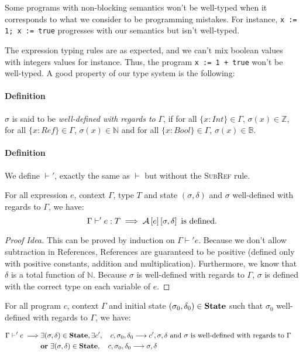 Some programs with non-blocking semantics won't be well-typed when it corresponds to what we consider to be programming mistakes. For instance, \texttt{x := 1; x := true} progresses with our semantics but isn't well-typed.

The expression typing rules are as expected, and we can't mix boolean values with integers values for instance. Thus, the program \texttt{x := 1 + true} won't be well-typed. A good property of our type system is the following:\\

\paragraph{Definition} $\sigma$ is said to be \textit{well-defined with regards to} $\Gamma$, if for all $\{x:Int\}\in\Gamma$, $\sigma(x)\in\mathbb{Z}$, for all $\{x:Ref\}\in\Gamma$, $\sigma(x)\in\mathbb{N}$ and for all $\{x:Bool\}\in\Gamma$, $\sigma(x)\in\mathbb{B}$.

\paragraph{Definition} We define $\vdash'$, exactly the same as $\vdash$ but without the \textsc{SubRef} rule.

\begin{thm}
For all expression $e$, context $\Gamma$, type $T$ and state $(\sigma, \delta)$ and $\sigma$ well-defined with regards to $\Gamma$, we have:
\[
\Gamma\vdash' e : T\implies \mathcal{A}\left[e\right]\left[\sigma,\delta\right]\text{ is defined}.
\]
\end{thm}

\begin{proof}[Proof Idea]
This can be proved by induction on $\Gamma\vdash' e$. Because we don't allow subtraction in References, References are guaranteed to be positive (defined only with positive constants, addition and multiplication). Furthermore, we know that $\delta$ is a total function of $\mathbb{N}$. Because $\sigma$ is well-defined with regards to $\Gamma$, $\sigma$ is defined with the correct type on each variable of $e$.
\end{proof}


\begin{thm}[Progress]
For all program $c$, context $\Gamma$ and initial state $(\sigma_0, \delta_0) \in \mathbf{State}{}$ such that $\sigma_0$ well-defined with regards to $\Gamma$, we have:

\begin{align*}
  \Gamma \vdash' c \implies & \exists (\sigma, \delta) \in \mathbf{State}{}, \exists c', \quad c, \sigma_0, \delta_0 \longrightarrow c',\sigma, \delta \text{ and $\sigma$ is well-defined with regards to $\Gamma$\quad} \\
  & \textbf{or}~ \exists (\sigma, \delta) \in \mathbf{State}{}, \quad c, \sigma_0, \delta_0 \longrightarrow \sigma, \delta
\end{align*}

\end{thm}

